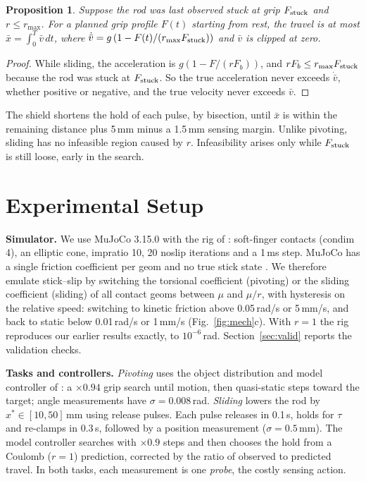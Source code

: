 \documentclass[10pt,twocolumn,letterpaper]{article}
\newtheorem{proposition}{Proposition}
\begin{document}
\begin{proposition}\label{prop:slide}
Suppose the rod was last observed stuck at grip $F_{\rm stuck}$ and $r\le r_{\max}$. For a planned grip profile $F(t)$ starting from rest, the travel is at most $\bar x=\int_0^T\bar v\,dt$, where $\dot{\bar v}=g\,(1-F(t)/(r_{\max}F_{\rm stuck}))$ and $\bar v$ is clipped at zero.
\end{proposition}
\begin{proof}
While sliding, the acceleration is $g(1-F/(rF_b))$, and $rF_b\le r_{\max}F_{\rm stuck}$ because the rod was stuck at $F_{\rm stuck}$. So the true acceleration never exceeds $\dot{\bar v}$, whether positive or negative, and the true velocity never exceeds $\bar v$.
\end{proof}
The shield shortens the hold of each pulse, by bisection, until $\bar x$ is within the remaining distance plus 5\,mm minus a 1.5\,mm sensing margin. Unlike pivoting, sliding has no infeasible region caused by $r$. Infeasibility arises only while $F_{\rm stuck}$ is still loose, early in the search.

\section{Experimental Setup}\label{sec:setup}
\textbf{Simulator.} We use MuJoCo 3.15.0 \cite{todorov2012} with the rig of \cite{aidoo2026a,aidoo2026b}: soft-finger contacts (condim 4), an elliptic cone, impratio 10, 20 noslip iterations and a 1\,ms step. MuJoCo has a single friction coefficient per geom and no true stick state \cite{mujocoissue}. We therefore emulate stick--slip by switching the torsional coefficient (pivoting) or the sliding coefficient (sliding) of all contact geoms between $\mu$ and $\mu/r$, with hysteresis on the relative speed: switching to kinetic friction above 0.05\,rad/s or 5\,mm/s, and back to static below 0.01\,rad/s or 1\,mm/s (Fig.~\ref{fig:mech}c). With $r=1$ the rig reproduces our earlier results exactly, to $10^{-6}$\,rad. Section~\ref{sec:valid} reports the validation checks.

\textbf{Tasks and controllers.} \emph{Pivoting} uses the object distribution and model controller of \cite{aidoo2026b}: a $\times0.94$ grip search until motion, then quasi-static steps toward the target; angle measurements have $\sigma=0.008$\,rad. \emph{Sliding} lowers the rod by $x^\ast\in[10,50]$\,mm using release pulses. Each pulse releases in 0.1\,s, holds for $\tau$ and re-clamps in 0.3\,s, followed by a position measurement ($\sigma=0.5$\,mm). The model controller searches with $\times0.9$ steps and then chooses the hold from a Coulomb ($r=1$) prediction, corrected by the ratio of observed to predicted travel. In both tasks, each measurement is one \emph{probe}, the costly sensing action.
\end{document}
